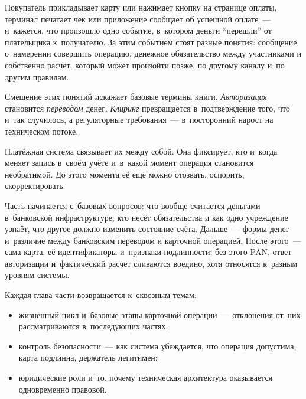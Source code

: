 %
Покупатель прикладывает карту или нажимает кнопку на странице оплаты,
терминал печатает чек или приложение сообщает об успешной оплате~---
и~кажется, что произошло одно событие, в~котором деньги \enquote{перешли}
от плательщика к~получателю. За этим событием стоят разные понятия: сообщение о~намерении совершить
операцию, денежное обязательство между участниками и собственно
расчёт, который может произойти позже, по другому каналу и~по другим правилам.

Смешение этих понятий искажает базовые термины книги. \textit{Авторизация}
становится \textit{переводом} денег.
\textit{Клиринг} превращается в~подтверждение того, что и~так случилось, а
регуляторные требования~--- в~посторонний нарост на техническом потоке.

Платёжная система связывает их между собой. Она фиксирует, кто и~когда меняет
запись в~своём учёте и~в~какой момент операция становится необратимой. До этого
момента её ещё можно отозвать, оспорить, скорректировать.

Часть начинается с~базовых вопросов: что вообще считается деньгами
в~банковской инфраструктуре, кто несёт обязательства и как одно учреждение
узнаёт, что другое должно изменить состояние счёта. Дальше~--- формы денег
и~различие между банковским переводом и карточной операцией. После этого~---
сама карта, её идентификаторы и~признаки подлинности; без этого PAN, ответ
авторизации и~фактический расчёт сливаются воедино, хотя относятся
к~разным уровням системы.

Каждая глава части возвращается к~сквозным темам:
\begin{itemize}
  \item жизненный цикл и~базовые этапы карточной операции~--- отклонения от~них
    рассматриваются в~последующих частях;
  \item контроль безопасности~--- как система убеждается, что операция
    допустима, карта подлинна, держатель легитимен;
  \item юридические роли и~то, почему техническая архитектура оказывается
    одновременно правовой.
\end{itemize}
